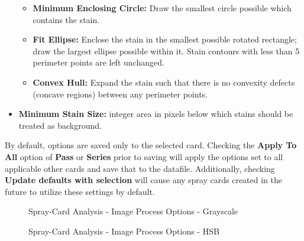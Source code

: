 \documentclass[10pt,letterpaper,titlepage]{article}
\begin{document}
\begin{itemize}
\begin{itemize}
            \item \textbf{Minimum Enclosing Circle:} Draw the smallest circle possible which contains the stain.
            \item \textbf{Fit Ellipse:} Enclose the stain in the smallest possible rotated rectangle; draw the largest ellipse possible within it. Stain contours with less than 5 perimeter points are left unchanged.
            \item \textbf{Convex Hull:} Expand the stain such that there is no convexity defects (concave regions) between any perimeter points.
        \end{itemize}
        \item \textbf{Minimum Stain Size:} integer area in pixels below which stains should be treated as background.
    \end{itemize}
    By default, options are saved only to the selected card. Checking the \textbf{Apply To All} option of \textbf{Pass} or \textbf{Series} prior to saving will apply the options set to all applicable other cards and save that to the datafile. Additionally, checking \textbf{Update defaults with selection} will cause any spray cards created in the future to utilize these settings by default.
    
    \begin{figure}[hb]
        \centering
        \caption{Spray-Card Analysis - Image Process Options - Grayscale}
        \label{fig:card_image_process_grayscale}
    \end{figure}
    \begin{figure}[hb]
        \centering
        \caption{Spray-Card Analysis - Image Process Options - HSB}
        \label{fig:card_image_process_hsb}
    \end{figure}
    \FloatBarrier
\end{document}
